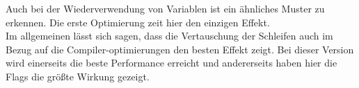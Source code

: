 \documentclass[a4paper]{article}
\begin{document}
Auch bei der Wiederverwendung von Variablen ist ein ähnliches Muster zu erkennen. Die erste Optimierung zeit hier den einzigen Effekt.
\\
Im allgemeinen lässt sich sagen, dass die Vertauschung der Schleifen auch im Bezug auf die Compiler-optimierungen den besten Effekt zeigt. Bei dieser Version wird einerseits die beste Performance erreicht und andererseits haben hier die Flags die größte Wirkung gezeigt.
\end{document}
